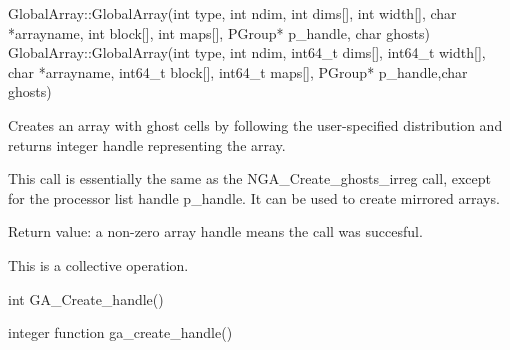 \documentclass[12pt]{article}
\begin{document}
\begin{cxxapi}
\begin{cxxcode}
GlobalArray::GlobalArray(int type, int ndim, int dims[], int width[],
                         char *arrayname, int block[], int maps[],
                         PGroup* p_handle, char ghosts)
GlobalArray::GlobalArray(int type, int ndim, int64_t dims[],
                         int64_t width[], char *arrayname,
                         int64_t block[], int64_t maps[],
                         PGroup* p_handle,char ghosts)
\end{cxxcode}
\begin{funcargs}
\end{funcargs}
\end{cxxapi}
\dcoll

\begin{desc}

Creates an array with ghost cells by following the user-specified distribution
and returns integer handle representing the array.

This call is essentially the same as the NGA_Create_ghosts_irreg call, except
for the processor list handle p_handle. It can be used to create mirrored arrays.

Return value: a non-zero array handle means the call was succesful.

This is a collective operation.

\end{desc}



\begin{capi}
\begin{ccode}
int GA_Create_handle()
\end{ccode}
\end{capi}

\begin{fapi}
\begin{fcode}
integer function ga_create_handle()
\end{fcode}
\end{fapi}
\end{document}
